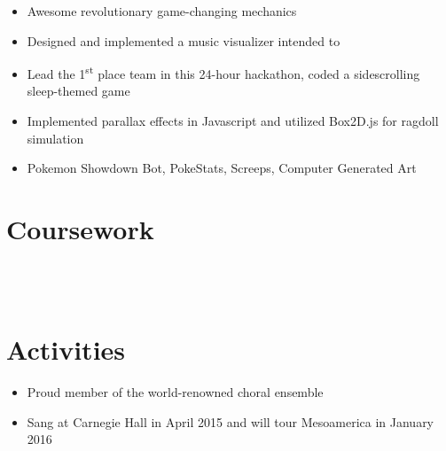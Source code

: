 \documentclass{zres}
\begin{document}
\begin{resume}
\begin{itemize}[leftmargin=10pt]
  \item Awesome revolutionary game-changing mechanics
\end{itemize}

\begin{itemize}[leftmargin=10pt]
  \item Designed and implemented a music visualizer intended to 
\end{itemize}

\begin{itemize}[leftmargin=10pt]
  \item Lead the 1\textsuperscript{st} place team in this 24-hour hackathon, coded a sidescrolling sleep-themed game
  \item Implemented parallax effects in Javascript and utilized Box2D.js for ragdoll simulation
\end{itemize}

\begin{itemize}[leftmargin=10pt]
  \item Pokemon Showdown Bot, PokeStats, Screeps, Computer Generated Art
\end{itemize}

\section{Coursework}

\\
\\

\section{Activities}

\begin{itemize}[leftmargin=10pt]
  \item Proud member of the world-renowned choral ensemble
  \item Sang at Carnegie Hall in April 2015 and will tour Mesoamerica in January 2016
\end{itemize}


\end{resume}
\end{document}
